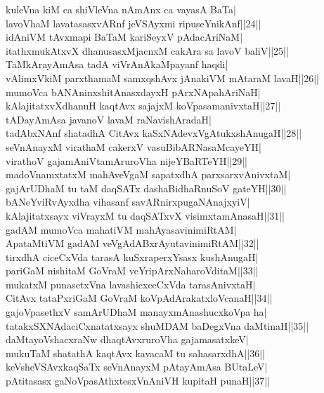 \documentclass{article}
\begin{document}
kuleVna kiM ca shiVleVna nAmAnx ca vayasA BaTa|\\
lavoVhaM lavatasasxvARnf jeVSAyxmi ripuseYnikAnf||24||\\
idAniVM tAvxmapi BaTaM kariSeyxV pAdacAriNaM|\\
itathxmukAtxvX dhanusasxMjacnxM cakAra sa lavoV baliV||25||\\
TaMkArayAmAsa tadA viVrAnAkaMpayanf haqdi|\\
vAlimxVkiM parxthamaM samxqshAvx jAnakiVM mAtaraM lavaH||26||\\
mumoVca bANAninxshitAnasxdayxH pArxNApahAriNaH|\\
kAlajitatxvXdhanuH kaqtAvx sajajxM koVpasamanivxtaH||27||\\
tADayAmAsa javanoV lavaM raNavishAradaH|\\
tadAbxNAnf shatadhA CitAvx kaSxNAdevxVgAtukxshAnugaH||28||\\
seVnAnayxM virathaM cakerxV vasuBibARNasaMcayeYH|\\
virathoV gajamAniVtamAruroVha nijeYBaRTeYH||29||\\
madoVnamxtatxM mahAveVgaM sapatxdhA parxsarxvAnivxtaM|\\
gajArUDhaM tu taM daqSATx dashaBidhaRnuSoV gateYH||30||\\
bANeYviRvAyxdha vihasanf savARnirxpugaNAnajxyiV|\\
kAlajitatxsayx viVrayxM tu daqSATxvX visimxtamAnasaH||31||\\
gadAM mumoVca mahatiVM mahAyasavinimiRtAM|\\
ApataMtiVM gadAM veVgAdABxrAyutavinimiRtAM||32||\\
tirxdhA ciceCxVda tarasA kuSxraperxYsasx kushAnugaH|\\
pariGaM nishitaM GoVraM veYripArxNaharoVditaM||33||\\
mukatxM punasetxVna lavashicxceCxVda tarasAnivxtaH|\\
CitAvx tataPxriGaM GoVraM koVpAdArakatxloVcanaH||34||\\
gajoVpasethxV samArUDhaM manayxmAnashucxkoVpa ha|\\
tatakxSXNAdaciCxnatatxsayx shuMDAM baDegxVna daMtinaH||35||\\
daMtayoVshacxraNw dhaqtAvxruroVha gajamasatxkeV|\\
mukuTaM shatathA kaqtAvx kavacaM tu sahasarxdhA||36||\\
keVsheVSAvxkaqSaTx seVnAnayxM pAtayAmAsa BUtaLeV|\\
pAtitasasx gaNoVpasAthxtesxVnAniVH kupitaH punaH||37||\\
\end{document}
